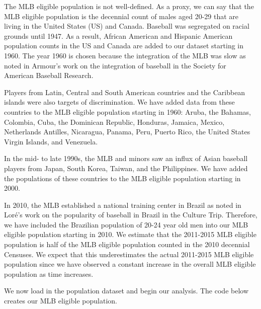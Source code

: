 \documentclass[11pt]{article}\usepackage[]{graphicx}\usepackage[]{color}
\begin{document}
The MLB eligible population is not well-defined.  As a proxy, we can say 
that the MLB eligible population is the decennial count of males aged 
20-29 that are living in the United States (US) 
and Canada. 
Baseball was segregated on racial grounds until 1947.  As a result, 
African American and Hispanic American population counts in the US  
and Canada are added to our dataset starting in 1960.  The year 1960 is chosen 
because the integration of the MLB was slow as noted in Armour's work on the 
integration of baseball in the Society for American Baseball Research.


Players from Latin, Central and South American countries and the Caribbean 
islands were also targets of discrimination.
We have added data from these countries to the MLB eligible population starting 
in 1960:
Aruba,
the Bahamas, 
Colombia, 
Cuba, 
the Dominican Republic, 
Honduras, 
Jamaica, 
Mexico, 
Netherlands Antilles, 
Nicaragua, 
Panama, 
Peru, 
Puerto Rico, 
the United States Virgin Islands, 
and Venezuela.  

In the mid- to late 1990s, the MLB and minors saw an influx of Asian baseball 
players from Japan, South Korea, Taiwan, and the Philippines.  
We have added the populations of these countries to the MLB eligible population 
starting in 2000.  

In 2010, the MLB established a national training center in Brazil %
as noted in Lor{\'e}'s work on the popularity of baseball in Brazil in the 
Culture Trip.
Therefore, we have included the Brazilian population of 20-24 year old 
men into our MLB eligible population starting in 2010.  
We estimate that the 2011-2015 MLB eligible population is half of the 
MLB eligible population counted in the 2010 decennial Censuses.  We expect 
that this underestimates the actual 2011-2015 MLB eligible population 
since we have observed a constant increase in the overall MLB eligible 
population as time increases.

We now load in the population dataset and begin our analysis.  The code 
below creates our MLB eligible population.
\end{document}
